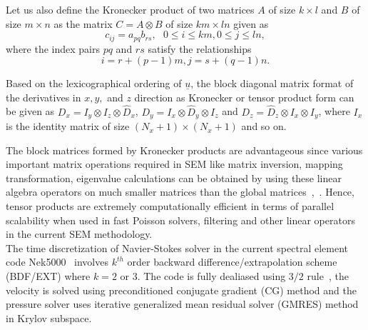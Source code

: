 \documentclass[times]{fldauth}
\begin{document}
Let us also define the Kronecker product of two matrices $A$ of size $k\times l$ and $B$ of size $m\times n$ as the matrix $C = A\otimes B$ of size $km\times ln$ given as 
\begin{equation}
c_{ij} = a_{pq}b_{rs},  \ \ \  0\le i\le km,  0\le j\le ln,
\end{equation}
where the index pairs $pq$ and $rs$ satisfy the relationships
\begin{equation}
i = r + (p-1)m ,      j = s + (q-1)n.
\end{equation}

 Based on the lexicographical ordering of $\underline{u}$, the block diagonal matrix format of the derivatives in $x,y,$ and $z$ direction as Kronecker or tensor product form can be given as $D_x = I_y\otimes I_z\otimes \hat{D}_x$, $D_y = I_x\otimes \hat{D}_y\otimes I_z$ and $D_z = \hat{D}_z\otimes I_x\otimes I_y$, where $I_x$ is the identity matrix of size $(N_x+1)\times (N_x+1)$ and so on. \\
\par
The block matrices formed by Kronecker products are advantageous since various important matrix operations required in SEM like matrix inversion, mapping transformation, eigenvalue calculations can be obtained by using these linear algebra operators on much smaller matrices than the global matrices~\cite{lynch},~\cite{deville}. Hence, tensor products are extremely computationally efficient in terms of parallel scalability when used in fast Poisson solvers, filtering and other linear operators in the current SEM methodology.\\

The time discretization of Navier-Stokes solver in the current spectral element code Nek5000~\cite{nek5000} involves $k^{th}$ order backward difference/extrapolation scheme (BDF/EXT) where $k = 2$ or $3$. The code is fully dealiased using $3/2$ rule~\cite{orz2,canuto}, the velocity  is solved using preconditioned conjugate gradient (CG) method and the pressure solver uses iterative generalized mean residual solver (GMRES) method in Krylov subspace.
\end{document}
